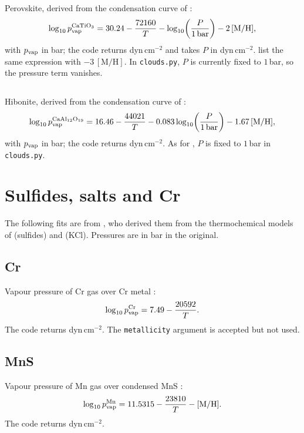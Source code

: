 \documentclass[11pt,a4paper]{article}
\newcommand{\code}[1]{\texttt{#1}}
\newcommand{\pvap}{p_{\rm vap}}
\newcommand{\MH}{[\mathrm{M/H}]}
\newcommand{\chem}[1]{\mathrm{#1}}
\begin{document}
\subsection{\texorpdfstring{\chem{CaTiO_3}}{CaTiO3}}
Perovskite, derived from the condensation curve of \citet{wakeford2017}:
\begin{equation}
  \log_{10} \pvap^{\rm CaTiO_3} = 30.24 - \frac{72160}{T}
  - \log_{10}\!\left(\frac{P}{1\,\mathrm{bar}}\right) - 2\,\MH ,
\end{equation}
with $\pvap$ in bar; the code returns dyn\,cm$^{-2}$ and takes $P$ in
dyn\,cm$^{-2}$. \citet{batalha2025} list the same expression with $-3\,\MH$.
In \code{clouds.py}, $P$ is currently fixed to $1$\,bar, so the pressure
term vanishes.

\subsection{\texorpdfstring{\chem{CaAl_{12}O_{19}}}{CaAl12O19}}
Hibonite, derived from the condensation curve of \citet{wakeford2017}:
\begin{equation}
  \log_{10} \pvap^{\rm CaAl_{12}O_{19}} = 16.46 - \frac{44021}{T}
  - 0.083\log_{10}\!\left(\frac{P}{1\,\mathrm{bar}}\right) - 1.67\,\MH ,
\end{equation}
with $\pvap$ in bar; the code returns dyn\,cm$^{-2}$. As for \chem{CaTiO_3},
$P$ is fixed to $1$\,bar in \code{clouds.py}.

\section{Sulfides, salts and Cr}

The following fits are from \citet{morley2012}, who derived them from the
thermochemical models of \citet{visscher2006} (sulfides) and
\citet{lodders1999} (KCl). Pressures are in bar in the original.

\subsection{Cr}
Vapour pressure of Cr gas over Cr metal \citep[][Eq.~5]{morley2012}:
\begin{equation}
  \log_{10} \pvap^{\rm Cr} = 7.49 - \frac{20592}{T} .
\end{equation}
The code returns dyn\,cm$^{-2}$. The \code{metallicity} argument is
accepted but not used.

\subsection{MnS}
Vapour pressure of Mn gas over condensed MnS
\citep[][Eq.~9, from \citealt{visscher2006}]{morley2012}:
\begin{equation}
  \log_{10} \pvap^{\rm Mn} = 11.5315 - \frac{23810}{T} - \MH .
\end{equation}
The code returns dyn\,cm$^{-2}$.
\end{document}
